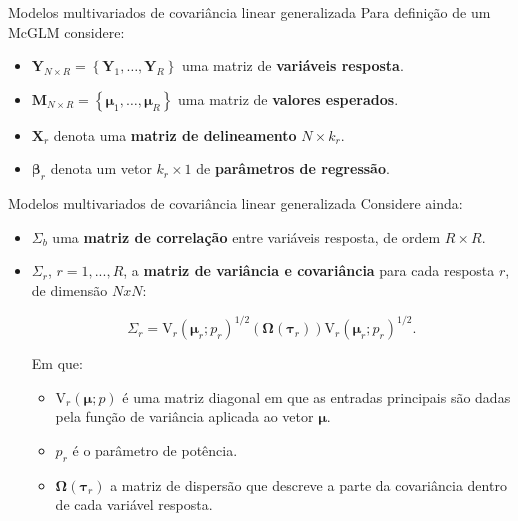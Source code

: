 \documentclass[
  ignorenonframetext,
  serif,
  professionalfont,
  usenames,
  dvipsnames,
  aspectratio = 169]{beamer}
\begin{document}
\begin{frame}{Modelos multivariados de covariância linear generalizada}
\protect\hypertarget{modelos-multivariados-de-covariuxe2ncia-linear-generalizada-4}{}
Para definição de um McGLM considere:

\begin{itemize}
  
  \itemsep 2ex
  
  \item $\boldsymbol{Y}_{N \times R} = \left \{ \boldsymbol{Y}_1, \dots, \boldsymbol{Y}_R \right \}$ uma matriz de \textbf{variáveis resposta}.
  
  \item $\boldsymbol{M}_{N \times R} = \left \{ \boldsymbol{\mu}_1, \dots, \boldsymbol{\mu}_R \right \}$ uma matriz de \textbf{valores esperados}.
  
  \item $\boldsymbol{X}_r$ denota uma \textbf{matriz de delineamento} $N \times k_r$.
  
  \item $\boldsymbol{\beta}_r$ denota um vetor $k_r \times 1$ de \textbf{parâmetros de regressão}.
  
\end{itemize}
\end{frame}

\begin{frame}{Modelos multivariados de covariância linear generalizada}
\protect\hypertarget{modelos-multivariados-de-covariuxe2ncia-linear-generalizada-5}{}
Considere ainda:

\begin{itemize}
  
  \itemsep 2ex
  
  \item $\Sigma_b$ uma \textbf{matriz de correlação} entre variáveis resposta, de ordem $R \times R$.
    
  \item $\Sigma_r$, $r = 1,..., R$, a \textbf{matriz de variância e covariância} para cada resposta $r$, de dimensão $NxN$:
  
$$
\Sigma_r = \mathrm{V}_r\left(\boldsymbol{\mu}_r; p_r\right)^{1/2}(\boldsymbol{\Omega}\left(\boldsymbol{\tau}_r\right))\mathrm{V}_r\left(\boldsymbol{\mu}_r; p_r\right)^{1/2}.
$$

Em que:

  \begin{itemize}
    \item $\mathrm{V}_r\left(\boldsymbol{\mu}; p\right)$ é uma matriz diagonal em que as entradas principais são dadas pela função de variância aplicada ao vetor $\boldsymbol{\mu}$. 
  
  \item $p_r$ é o parâmetro de potência. 
  
  \item $\boldsymbol{\Omega}\left(\boldsymbol{\tau}_r\right)$ a matriz de dispersão que descreve a parte da covariância dentro de cada variável resposta. 
  \end{itemize}
  
\end{itemize}
\end{frame}
\end{document}
